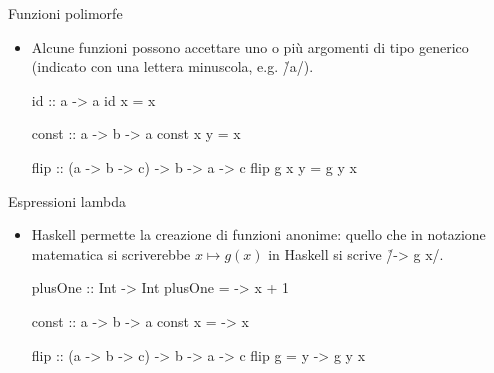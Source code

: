 \begin{frame}[fragile]{\secname}{Funzioni polimorfe}
\begin{itemize}
\item Alcune funzioni possono accettare uno o più argomenti di tipo generico (indicato con una lettera minuscola, e.g. \h/a/).
\pause

\begin{haskellcode}
id :: a -> a
id x = x

const :: a -> b -> a
const x y = x

flip :: (a -> b -> c) -> b -> a -> c
flip g x y = g y x
\end{haskellcode}

\end{itemize}
\end{frame}

\begin{frame}[fragile]{\secname}{Espressioni lambda}
\begin{itemize}
\item Haskell permette la creazione di funzioni anonime: quello che in notazione matematica si scriverebbe $x\mapsto g(x)$ in Haskell si scrive \h/\x -> g x/.

\pause
\begin{haskellcode}
plusOne :: Int -> Int
plusOne = \x -> x + 1

const :: a -> b -> a
const x = \y -> x

flip :: (a -> b -> c) -> b -> a -> c
flip g = \x y -> g y x
\end{haskellcode}
\end{itemize}
\end{frame}
